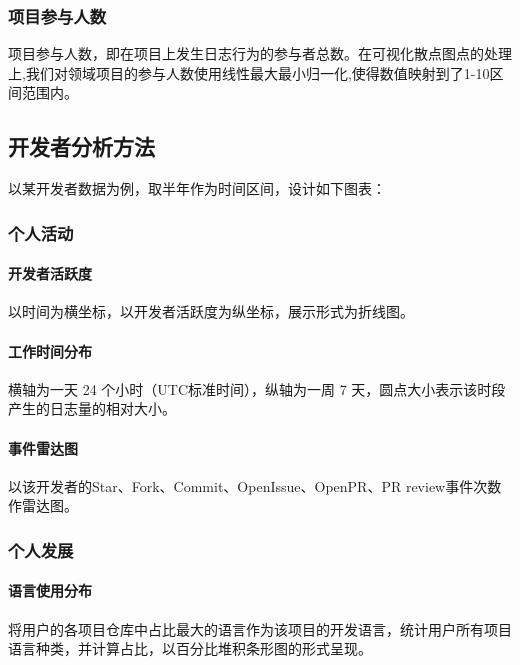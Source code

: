 \subsubsection{项目参与人数}
\par 项目参与人数，即在项目上发生日志行为的参与者总数。在可视化散点图点的处理上,我们对领域项目的参与人数使用线性最大最小归一化,使得数值映射到了1-10区间范围内。


\subsection{开发者分析方法}
\par 以某开发者数据为例，取半年作为时间区间，设计如下图表：
\subsubsection{个人活动}
\paragraph{开发者活跃度} 以时间为横坐标，以开发者活跃度为纵坐标，展示形式为折线图。

\paragraph{工作时间分布} 横轴为一天 24 个小时（UTC标准时间），纵轴为一周 7 天，圆点大小表示该时段产生的日志量的相对大小。

\paragraph{事件雷达图} 以该开发者的Star、Fork、Commit、OpenIssue、OpenPR、PR review事件次数作雷达图。

\subsubsection{个人发展}
\paragraph{语言使用分布} 将用户的各项目仓库中占比最大的语言作为该项目的开发语言，统计用户所有项目语言种类，并计算占比，以百分比堆积条形图的形式呈现。

